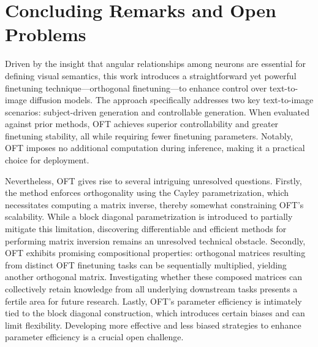 \section{Concluding Remarks and Open Problems}

Driven by the insight that angular relationships among neurons are essential for defining visual semantics, this work introduces a straightforward yet powerful finetuning technique—orthogonal finetuning—to enhance control over text-to-image diffusion models. The approach specifically addresses two key text-to-image scenarios: subject-driven generation and controllable generation. When evaluated against prior methods, OFT achieves superior controllability and greater finetuning stability, all while requiring fewer finetuning parameters. Notably, OFT imposes no additional computation during inference, making it a practical choice for deployment.

Nevertheless, OFT gives rise to several intriguing unresolved questions. Firstly, the method enforces orthogonality using the Cayley parametrization, which necessitates computing a matrix inverse, thereby somewhat constraining OFT's scalability. While a block diagonal parametrization is introduced to partially mitigate this limitation, discovering differentiable and efficient methods for performing matrix inversion remains an unresolved technical obstacle. Secondly, OFT exhibits promising compositional properties: orthogonal matrices resulting from distinct OFT finetuning tasks can be sequentially multiplied, yielding another orthogonal matrix. Investigating whether these composed matrices can collectively retain knowledge from all underlying downstream tasks presents a fertile area for future research. Lastly, OFT’s parameter efficiency is intimately tied to the block diagonal construction, which introduces certain biases and can limit flexibility. Developing more effective and less biased strategies to enhance parameter efficiency is a crucial open challenge.